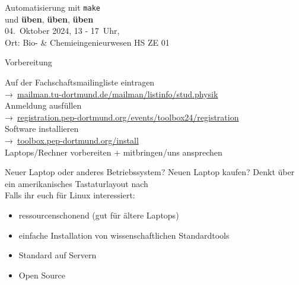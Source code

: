 \begin{frame}
  \begin{center}
    \huge Automatisierung mit \texttt{make}\\[0.5\baselineskip]
    und \textbf{üben}, \textbf{üben}, \textbf{üben}\\[0.5\baselineskip]
    04.~Oktober 2024, 13 - 17~Uhr,\\
    Ort: Bio- \& Chemieingenieurwesen HS ZE 01
  \end{center}
\end{frame}

\begin{frame}{Vorbereitung}
  \begin{center}
    \huge
    Auf der Fachschaftsmailingliste eintragen \\
    →~\href{https://mailman.tu-dortmund.de/mailman/listinfo/stud.physik}{mailman.tu-dortmund.de/mailman/listinfo/stud.physik}\\[0.5\baselineskip]
    Anmeldung ausfüllen\\
    →~\textcolor{blue!70!black}{\href{https://registration.pep-dortmund.org/events/toolbox24/registration/}{registration.pep-dortmund.org/events/toolbox24/registration}}\\[0.5\baselineskip]
    Software installieren\\
    →~\textcolor{blue!70!black}{\href{https://toolbox.pep-dortmund.org/install/install/}{toolbox.pep-dortmund.org/install}}\\[0.5\baselineskip]
    Laptops/Rechner vorbereiten + mitbringen/uns ansprechen
  \end{center}
\end{frame}
\begin{frame}{Neuer Laptop oder anderes Betriebssystem?}
  \huge
  Neuen Laptop kaufen? \newline
  Denkt über ein amerikanisches Tastaturlayout nach\\[0.5\baselineskip]

  Falls ihr euch für Linux interessiert:
	\begin{itemize}
		\item ressourcenschonend (gut für ältere Laptops)
		\item einfache Installation von wissenschaftlichen Standardtools
		\item Standard auf Servern
		\item Open Source
	\end{itemize}
\end{frame}
